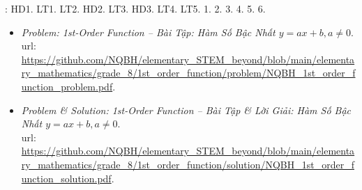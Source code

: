 \documentclass{article}
\begin{document}
\noindent\cite[\S1, pp. 5--11]{SGK_Toan_9_Canh_Dieu_tap_1}: HD1. LT1. LT2. HD2. LT3. HD3. LT4. LT5. 1. 2. 3. 4. 5. 6.
\begin{itemize}
	\item \textit{Problem: 1st-Order Function -- Bài Tập: Hàm Số Bậc Nhất $y = ax + b,a\ne0$}.\\{\sc url}: \url{https://github.com/NQBH/elementary_STEM_beyond/blob/main/elementary_mathematics/grade_8/1st_order_function/problem/NQBH_1st_order_function_problem.pdf}.
	\item \textit{Problem \& Solution: 1st-Order Function -- Bài Tập \& Lời Giải: Hàm Số Bậc Nhất $y = ax + b,a\ne0$}.\\{\sc url}: \url{https://github.com/NQBH/elementary_STEM_beyond/blob/main/elementary_mathematics/grade_8/1st_order_function/solution/NQBH_1st_order_function_solution.pdf}.
\end{itemize}

\end{document}
